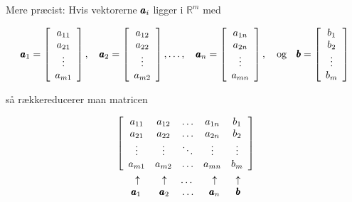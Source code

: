 Mere præcist: Hvis vektorerne $\pmb{a}_i$ ligger i $\mathbb{R}^m$ med

\[
\pmb{a}_1 = \left[\begin{array}{c}
a_{11} \\
a_{21} \\
\vdots \\
a_{m1}
\end{array}\right], \quad \pmb{a}_2 = \left[\begin{array}{c}
a_{12} \\
a_{22} \\
\vdots \\
a_{m2}
\end{array}\right], \ldots, \quad \pmb{a}_n = \left[\begin{array}{c}
a_{1n} \\
a_{2n} \\
\vdots \\
a_{mn}
\end{array}\right], \quad \text{og} \quad \pmb{b} = \left[\begin{array}{c}
b_1 \\
b_2 \\
\vdots \\
b_m
\end{array}\right]
\]

så rækkereducerer man matricen

\[
\begin{aligned}
& \left[\begin{array}{ccccc}
a_{11} & a_{12} & \ldots & a_{1n} & b_1 \\
a_{21} & a_{22} & \ldots & a_{2n} & b_2 \\
\vdots & \vdots & \ddots & \vdots & \vdots \\
a_{m1} & a_{m2} & \ldots & a_{mn} & b_m
\end{array}\right] \\
& \begin{array}{ccccc}
\hspace{0.5cm} \uparrow & \hspace{0.3cm} \uparrow & \hspace{0.0cm} \ldots & \hspace{0.2cm} \uparrow & \hspace{0.2cm} \uparrow \\
\hspace{0.4cm} \pmb{a}_1 & \hspace{0.3cm} \pmb{a}_2 & \hspace{0.1cm} \ldots & \hspace{0.2cm} \pmb{a}_n & \hspace{0.2cm} \pmb{b}
\end{array}
\end{aligned}
\]


